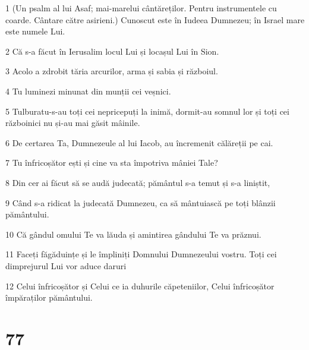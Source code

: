 \par 1 (Un psalm al lui Asaf; mai-marelui cântăreților. Pentru instrumentele cu coarde. Cântare către asirieni.) Cunoscut este în Iudeea Dumnezeu; în Israel mare este numele Lui.
\par 2 Că s-a făcut în Ierusalim locul Lui și locașul Lui în Sion.
\par 3 Acolo a zdrobit tăria arcurilor, arma și sabia și războiul.
\par 4 Tu luminezi minunat din munții cei veșnici.
\par 5 Tulburatu-s-au toți cei nepricepuți la inimă, dormit-au somnul lor și toți cei războinici nu și-au mai găsit mâinile.
\par 6 De certarea Ta, Dumnezeule al lui Iacob, au încremenit călăreții pe cai.
\par 7 Tu înfricoșător ești și cine va sta împotriva mâniei Tale?
\par 8 Din cer ai făcut să se audă judecată; pământul s-a temut și s-a liniștit,
\par 9 Când s-a ridicat la judecată Dumnezeu, ca să mântuiască pe toți blânzii pământului.
\par 10 Că gândul omului Te va lăuda și amintirea gândului Te va prăznui.
\par 11 Faceți făgăduințe și le împliniți Domnului Dumnezeului vostru. Toți cei dimprejurul Lui vor aduce daruri
\par 12 Celui înfricoșător și Celui ce ia duhurile căpeteniilor, Celui înfricoșător împăraților pământului.

\chapter{77}

